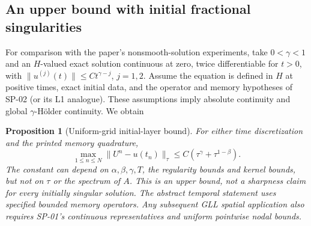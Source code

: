 \documentclass[11pt,a4paper]{amsart}
\theoremstyle{remark}
\theoremstyle{plain}
\newtheorem{proposition}{Proposition}[section]
\theoremstyle{remark}
\numberwithin{equation}{section}
\begin{document}
\subsection{An upper bound with initial fractional singularities}
For comparison with the paper's nonsmooth-solution experiments, take $0<\gamma<1$ and an $H$-valued exact solution continuous at zero, twice differentiable for $t>0$, with $\|u^{(j)}(t)\|\le C t^{\gamma-j}$, $j=1,2$. Assume the equation is defined in $H$ at positive times, exact initial data, and the operator and memory hypotheses of SP-02 (or its L1 analogue). These assumptions imply absolute continuity and global $\gamma$-H\"older continuity. We obtain
\begin{proposition}[Uniform-grid initial-layer bound]\label{prop:tm01-singular}
For either time discretization and the printed memory quadrature,
\[
 \max_{1\le n\le N}\|U^n-u(t_n)\|_\tau
 \le C(\tau^\gamma+\tau^{1-\beta}).
\]
The constant can depend on $\alpha,\beta,\gamma,T$, the regularity bounds and kernel bounds, but not on $\tau$ or the spectrum of $A$. This is an upper bound, not a sharpness claim for every initially singular solution. The abstract temporal statement uses specified bounded memory operators. Any subsequent GLL spatial application also requires SP-01's continuous representatives and uniform pointwise nodal bounds.
\end{proposition}
\end{document}
